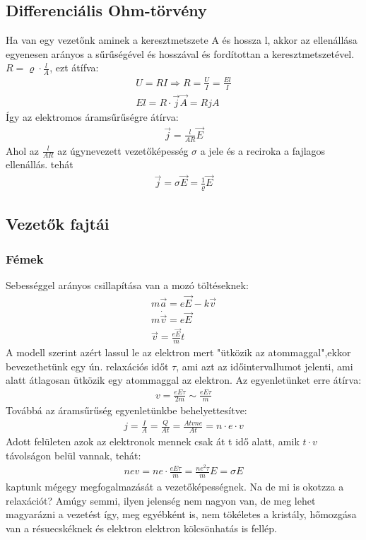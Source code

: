 \documentclass{article}
\begin{document}
\subsection{Differenciális Ohm-törvény}
Ha van egy vezetőnk aminek a keresztmetszete A és hossza l, akkor az ellenállása egyenesen arányos a sűrűségével és hosszával és fordítottan a keresztmetszetével. $R = \varrho \cdot \frac{l}{A}$, ezt átífva:
\begin{gather*}
U=RI \Rightarrow R=\frac{U}{I} = \frac{El}{I} \\
El = R \cdot \vec{j} \vec{A} = RjA
\end{gather*}
Így az elektromos áramsűrűségre átírva:
\begin{gather*}
\vec{j} = \frac{l}{AR}\vec{E}
\end{gather*}
Ahol az $\frac{l}{AR}$ az úgynevezett vezetőképesség $\sigma$ a jele  és a reciroka a fajlagos ellenállás. tehát
\begin{gather*}
\vec{j}  =\sigma \vec{E} = \frac{1}{\varrho} \vec{E}
\end{gather*}
\subsection{Vezetők fajtái}
\subsubsection{Fémek}
Sebességgel arányos csillapítása van a mozó töltéseknek:
\begin{gather*}
m\vec{a} = e\vec{E} - k\vec{v} \\
m\dot{\vec{v}} = e\vec{E} \\
\vec{v} = \frac{e\vec{E}}{m}t
\end{gather*}
A modell szerint azért lassul le az elektron mert "ütközik az atommaggal",ekkor bevezethetünk egy ún. relaxációs időt $\tau$, ami azt az időintervallumot jelenti, ami alatt átlagosan ütközik egy atommaggal az elektron. Az egyenletünket erre átírva:
\begin{gather*}
v = \frac{eE\tau}{2m} \sim \frac{eE\tau}{m}
\end{gather*}
Továbbá az áramsűrűség egyenletünkbe behelyettesítve:
\begin{gather*}
j = \frac{I}{A} =\frac{Q}{At} = \frac{Atvne}{At} = n\cdot e \cdot v
\end{gather*}
Adott felületen azok az elektronok mennek csak át t idő alatt, amik $t \cdot v$ távolságon belül vannak, tehát:
\begin{gather*}
nev = ne \cdot \frac{eE\tau}{m} = \frac{ne^2\tau}{m}E = \sigma E
\end{gather*}
kaptunk mégegy megfogalmazását a vezetőképességnek.
Na de mi is okotzza a relaxációt? Amúgy semmi, ilyen jelenség nem nagyon van, de meg lehet magyarázni a vezetést így, meg egyébként is, nem tökéletes a kristály, hőmozgása van a résuecskéknek és elektron elektron kölcsönhatás is fellép.
\end{document}
